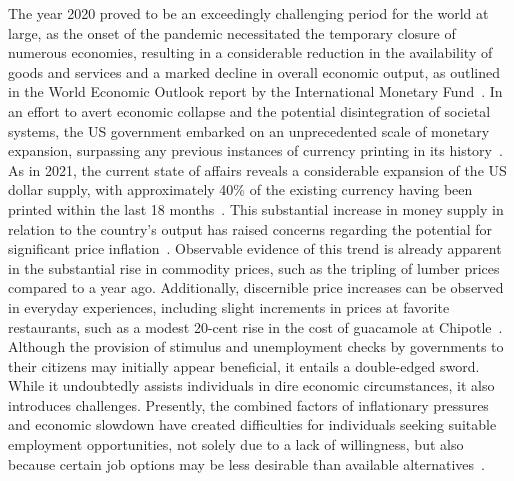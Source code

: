 The year 2020 proved to be an exceedingly challenging period for the world at large, as the onset of the pandemic necessitated the temporary
closure of numerous economies, resulting in a considerable reduction in the availability of goods and services and a marked decline in overall
economic output, as outlined in the World Economic Outlook report by the International Monetary Fund~\cite{imf2020}. In an effort to avert
economic collapse and the potential disintegration of societal systems, the US government embarked on an unprecedented scale of monetary
expansion, surpassing any previous instances of currency printing in its history~\cite{blinder2020}. As in 2021, the current state of affairs
reveals a considerable expansion of the US dollar supply, with approximately 40\% of the existing currency having been printed within the last
18 months~\cite{fedmoneysupply}. This substantial increase in money supply in relation to the country's output has raised concerns regarding
the potential for significant price inflation~\cite{Blanchard2021}. Observable evidence of this trend is already apparent in the substantial
rise in commodity prices, such as the tripling of lumber prices compared to a year ago. Additionally, discernible price increases can be
observed in everyday experiences, including slight increments in prices at favorite restaurants, such as a modest 20-cent rise in the cost of
guacamole at Chipotle~\cite{BLS}. Although the provision of stimulus and unemployment checks by governments to their citizens may initially
appear beneficial, it entails a double-edged sword. While it undoubtedly assists individuals in dire economic circumstances, it also introduces
challenges. Presently, the combined factors of inflationary pressures and economic slowdown have created difficulties for individuals seeking
suitable employment opportunities, not solely due to a lack of willingness, but also because certain job options may be less desirable than
available alternatives~\cite{cbo2020, kahn2020}.

